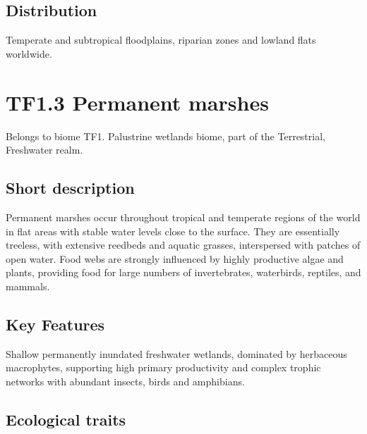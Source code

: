 \documentclass[
  letterpaper,
  DIV=11,
  numbers=noendperiod]{scrartcl}
\begin{document}
\subsection{Distribution}\label{distribution-104}

Temperate and subtropical floodplains, riparian zones and lowland flats
worldwide.

\section{TF1.3 Permanent marshes}\label{tf1.3-permanent-marshes}

Belongs to biome TF1. Palustrine wetlands biome, part of the
Terrestrial, Freshwater realm.

\subsection{Short description}\label{short-description-105}

Permanent marshes occur throughout tropical and temperate regions of the
world in flat areas with stable water levels close to the surface. They
are essentially treeless, with extensive reedbeds and aquatic grasses,
interspersed with patches of open water. Food webs are strongly
influenced by highly productive algae and plants, providing food for
large numbers of invertebrates, waterbirds, reptiles, and mammals.

\subsection{Key Features}\label{key-features-105}

Shallow permanently inundated freshwater wetlands, dominated by
herbaceous macrophytes, supporting high primary productivity and complex
trophic networks with abundant insects, birds and amphibians.

\subsection{Ecological traits}\label{ecological-traits-105}
\end{document}
